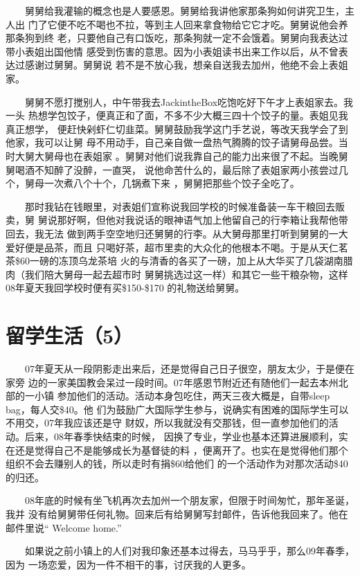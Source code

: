 \documentclass[12pt]{book}
\begin{document}
　　舅舅给我灌输的概念也是人要感恩。舅舅给我讲他家那条狗如何讲究卫生，主人出
门了它便不吃不喝也不拉，等到主人回来拿食物给它它才吃。舅舅说他会养那条狗到终
老，只要他自己有口饭吃，那条狗就一定不会饿着。舅舅向我表达过带小表姐出国他情
感受到伤害的意思。因为小表姐读书出来工作以后，从不曾表达过感谢过舅舅。舅舅说
若不是不放心我，想亲自送我去加州，他绝不会上表姐家。

　　舅舅不愿打搅别人，中午带我去JackintheBox吃饱吃好下午才上表姐家去。我一头
热想学包饺子，便真正和了面，不多不少大概三四十个饺子的量。表姐见我真正想学，
便赶快剁虾仁切韭菜。舅舅鼓励我学这门手艺说，等改天我学会了到他家，我可以让舅
母不用动手，自己亲自做一盘热气腾腾的饺子请舅母品尝。当时大舅大舅母也在表姐家
。舅舅对他们说我靠自己的能力出来很了不起。当晚舅舅喝酒不知醉了没醉，一直哭，
说他命苦什么的，最后除了表姐家两小孩尝过几个，舅母一次煮八个十个，几锅煮下来
，舅舅把那些个饺子全吃了。

　　那时我钻在钱眼里，对表姐们宣称说我回学校的时候准备装一车干粮回去贩卖，舅
舅说那好啊，但他对我说话的眼神语气加上他留自己的行李箱让我帮他带回去，我无法
做到两手空空地归还舅舅的行李。从大舅母那里打听到舅舅的一大爱好便是品茶，而且
只喝好茶，超市里卖的大众化的他根本不喝。于是从天仁茗茶\$60一磅的冻顶乌龙茶培
火的与清香的各买了一磅，加上从大华买了几袋湖南腊肉（我们陪大舅母一起去超市时
舅舅挑选过这一样）和其它一些干粮杂物，这样08年夏天我回学校时便有买\$150-\$170
的礼物送给舅舅。
\section{留学生活（5）}
\label{sec-6-5}

　　07年夏天从一段阴影走出来后，还是觉得自己日子很空，朋友太少，于是便在家旁
边的一家美国教会呆过一段时间。07年感恩节附近还有随他们一起去本州北部的一小镇
参加他们的活动。活动本身包吃住，两天三夜大概是，自带sleep bag，每人交\$40。他
们为鼓励广大国际学生参与，说确实有困难的国际学生可以不用交，07年我应该还是守
财奴，所以我就没有交那钱，但一直参加他们的活动。后来，08年春季快结束的时候，
因换了专业，学业也基本还算进展顺利，实在还是觉得自己不是能够成长为基督徒的料
，便离开了。也实在是觉得他们那个组织不会去赚别人的钱，所以走时有捐\$60给他们
的一个活动作为对那次活动\$40的归还。

　　08年底的时候有坐飞机再次去加州一个朋友家，但限于时间匆忙，那年圣诞，我并
没有给舅舅带任何礼物。回来后有给舅舅写封邮件，告诉他我回来了。他在邮件里说“
Welcome home.”

　　如果说之前小镇上的人们对我印象还基本过得去，马马乎乎，那么09年春季，因为
一场恋爱，因为一件不相干的事，讨厌我的人更多。
\end{document}
